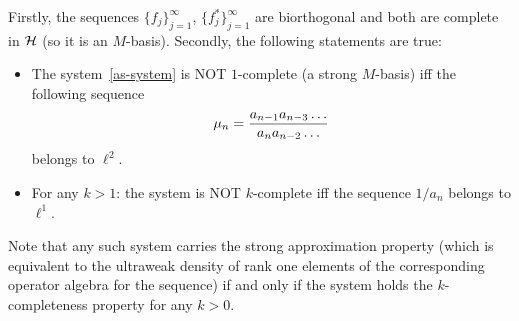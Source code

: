   \begin{theorem}
    \label{thm_as}
    Firstly, the sequences $\{f_j\}_{j=1}^\infty$, $\{f^*_j\}_{j=1}^\infty$ are biorthogonal
      and both are complete in $\cal{H}$ (so it is an $M$-basis).
    Secondly, the following statements are true:
    \begin{itemize}
      \item  The system~\eqref{as-system} is NOT $1$-complete (a strong $M$-basis) iff the following sequence
        \begin{equation}
          \mu_n = \frac{a_{n-1} a_{n-3} \dots}{a_{n} a_{n-2} \dots }\\
        \end{equation}
        belongs to $\ell^2$.
      \item For any $k>1$: the system is NOT $k$-complete iff the sequence $1/a_n$ belongs to $\ell^1$.
    \end{itemize}
  \end{theorem}
  \begin{remark}
    Note that any such system carries the strong approximation property (which is equivalent to the
    ultraweak density of rank one elements of the corresponding operator algebra for the sequence) 
    if and only if the system holds the $k$-completeness property for any $k>0$.
  \end{remark}

